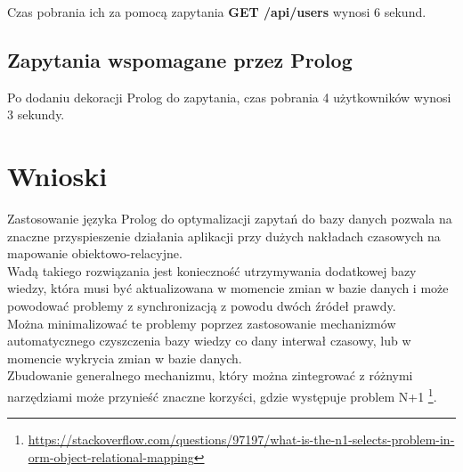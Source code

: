 \documentclass[12pt,a4paper]{article}
\begin{document}
Czas pobrania ich za pomocą zapytania \textbf{GET /api/users} wynosi 6 sekund.\\

\subsection{Zapytania wspomagane przez Prolog}

Po dodaniu dekoracji Prolog do zapytania, czas pobrania 4 użytkowników wynosi 3 sekundy.

\clearpage
\section{Wnioski}

Zastosowanie języka Prolog do optymalizacji zapytań do bazy danych pozwala na znaczne przyspieszenie działania aplikacji przy dużych nakładach czasowych na mapowanie obiektowo-relacyjne.\\

Wadą takiego rozwiązania jest konieczność utrzymywania dodatkowej bazy wiedzy, która musi być aktualizowana w momencie zmian w bazie danych i może powodować problemy z synchronizacją z powodu dwóch źródeł prawdy.\\

Można minimalizować te problemy poprzez zastosowanie mechanizmów automatycznego czyszczenia bazy wiedzy co dany interwał czasowy, lub w momencie wykrycia zmian w bazie danych.\\

Zbudowanie generalnego mechanizmu, który można zintegrować z różnymi narzędziami może przynieść znaczne korzyści, gdzie występuje problem N+1 \footnote{\href{https://stackoverflow.com/questions/97197/what-is-the-n1-selects-problem-in-orm-object-relational-mapping}{https://stackoverflow.com/questions/97197/what-is-the-n1-selects-problem-in-orm-object-relational-mapping}}.
\end{document}

